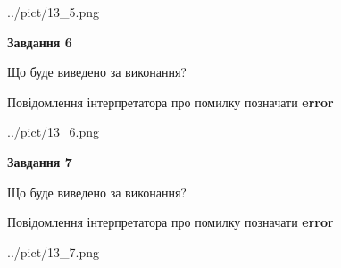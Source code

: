 \documentclass[10pt, ukrainian]{article}
\begin{document}
{\begin {large}
\begin{center}
	{../pict/13_5.png}
\end{center}
\newpage

{\begin {center}\textbf{Завдання 6}\end {center}}\par
Що буде виведено за виконання? \par
Повідомлення інтерпретатора про помилку позначати \textbf{error}

\begin{center}
	{../pict/13_6.png}
\end{center}
\newpage

{\begin {center}\textbf{Завдання 7}\end {center}}\par
Що буде виведено за виконання? \par
Повідомлення інтерпретатора про помилку позначати \textbf{error}

\begin{center}
	{../pict/13_7.png}
\end{center}
\newpage

\end {large}}
\end{document}
